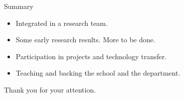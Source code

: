 \documentclass{beamer}
\begin{document}
\begin{frame}{Summary}

  \begin{block}{}
        \begin{center}
          \begin{itemize}
            \item Integrated in a research team.
            \item Some early research results. More to be done.
            \item Participation in projects and technology transfer.
            \item Teaching and backing the school and the department.
          \end{itemize}
        \end{center}
  \end{block}
  
  \vskip 1cm
        \begin{center}
          Thank you for your attention. 

        \end{center}
\end{frame}
\end{document}
